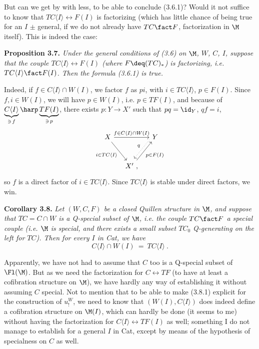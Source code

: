 But can we get by with less, to be able to conclude (3.6.1)? Would it not suffice to know that $TC\langle I\rangle\longleftrightarrow F(I)$ is factorizing (which has little chance of being true for an $I$ $\pm$ general, if we do not already have $TC\fact F$, factorization in $\M$ itself). This is indeed the case:

\textbf{Proposition 3.7.} \textit{Under the general conditions of \textup{(3.6)} on $\M$, $W$, $C$, $I$, suppose that the couple $TC\langle I\rangle\longleftrightarrow F(I)$ (where $F\deq (TC)_*$) is factorizing, i.e. $TC\langle I\rangle\fact F(I)$. Then the formula \textup{(3.6.1)} is true.}

Indeed, if $f\in C\langle I\rangle\cap W(I)$, we factor $f$ as $pi$, with $i\in TC\langle I\rangle$, $p\in F(I)$. Since $f,i\in W(I)$, we will have $p\in W(I)$, i.e. $p\in TF(I)$, and because of $\underbrace{C\langle I\rangle}_{\ni\, f}\harp\underbrace{TF(I)}_{\ni\, p}$, there exists $p : Y\longrightarrow X'$ such that $pq=\id_Y$, $qf=i$, %
\[
\begin{tikzcd}[column sep=small, row sep=large]
X \arrow[rr, "f\in C\langle I\rangle\cap W(I)"] \arrow[dr, "i\in TC\langle I\rangle"'] & & Y \arrow[dl, dotted, shift right=1ex, "q"'] \\
& X' \arrow[ur, "p\in F(I)"'] \ , &
\end{tikzcd}
\]
so $f$ is a direct factor of $i\in TC\langle I\rangle$. Since $TC\langle I\rangle$ is stable under direct factors, we win.

\textbf{Corollary 3.8.} \textit{Let $(W,C,F)$ be a closed Quillen structure in $\M$, and suppose that $TC=C\cap W$ is a Q-special subset of $\M$, i.e. the couple $TC\fact F$ a special couple (i.e. $\M$ is \textup{special}, and there exists a small subset $TC_0$ Q-generating on the left for $TC$). Then for every $I$ in \textup{Cat}, we have}
\[
C\langle I\rangle\cap W(I) \ = \ TC\langle I\rangle \ . \tag*{(3.8.1)}
\]

Apparently, we have not had to assume that $C$ too is a Q-special subset of $\Fl(\M)$. But as we need the factorization for $C\longleftrightarrow TF$ (to have at least a cofibration structure on $\M$), we have hardly any way of establishing it without assuming $C$ special. Not to mention that to be able to make (3.8.1) explicit for the construction of $u^{W}_{!}$, we need to know that $(W(I),C\langle I\rangle)$ does indeed define a cofibration structure on $\M(I)$, which can hardly be done (it seems to me) without having the factorization for $C\langle I\rangle\longleftrightarrow TF(I)$ as well; something I do not manage to establish for a general $I$ in Cat, except by means of the hypothesis of specialness on $C$ as well.

